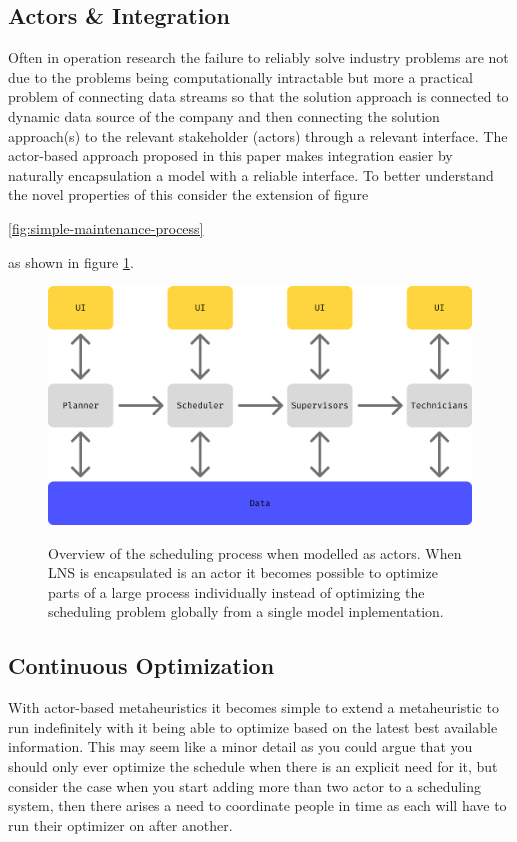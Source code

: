 \documentclass[preprint,12pt,authoryear]{elsarticle}
\begin{document}
\subsection{Actors \& Integration}
Often in operation research the failure to reliably solve industry problems are not due to the problems being computationally intractable 
but more a practical problem of connecting data streams so that the solution approach is connected to dynamic data source of the company
and then connecting the solution approach(s) to the relevant stakeholder (actors) through a relevant interface. The actor-based approach 
proposed in this paper makes integration easier by naturally encapsulation a model with a reliable interface. To better understand the 
novel properties of this consider the extension of figure 

\ref{fig:simple-maintenance-process}

as shown in figure \ref{fig:integrated:maintenance-process}.


\begin{figure}[H]
\centering
\includegraphics[width=1.0\textwidth]{figures/Scheduling Process Integrated.png}
\label{fig:integrated:maintenance-process}
\caption{Overview of the scheduling process when modelled as actors. When LNS is encapsulated 
is an actor it becomes possible to optimize parts of a large process individually instead of 
optimizing the scheduling problem globally from a single model inplementation.}
\end{figure}


\subsection{Continuous Optimization}
With actor-based metaheuristics it becomes simple to extend a metaheuristic to run
indefinitely with it being able to optimize based on the latest best 
available information. This may seem like a minor detail as you could argue that you should only ever optimize the schedule when there is 
an explicit need for it, but consider the case when you start adding more than two actor to a scheduling system, then there arises a need
to coordinate people in time as each will have to run their optimizer on after another.




\end{document}
